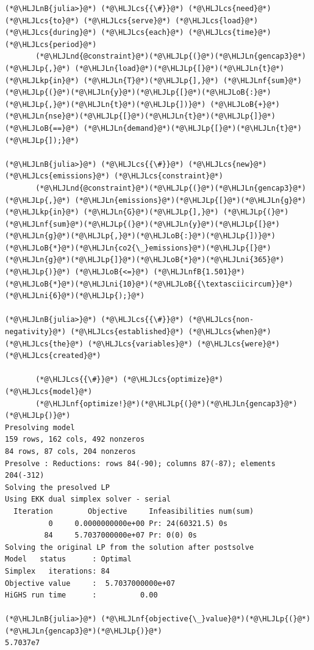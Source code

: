 \documentclass[12pt,a4paper]{article}
\newcommand{\HLJLkp}[1]{\textcolor[RGB]{148,91,176}{\textbf{#1}}}
\newcommand{\HLJLn}[1]{#1}
\newcommand{\HLJLnd}[1]{\textcolor[RGB]{214,102,97}{#1}}
\newcommand{\HLJLnf}[1]{\textcolor[RGB]{66,102,213}{#1}}
\newcommand{\HLJLnB}[1]{\textcolor[RGB]{59,151,46}{#1}}
\newcommand{\HLJLnfB}[1]{\textcolor[RGB]{59,151,46}{#1}}
\newcommand{\HLJLni}[1]{\textcolor[RGB]{59,151,46}{#1}}
\newcommand{\HLJLoB}[1]{\textcolor[RGB]{102,102,102}{\textbf{#1}}}
\newcommand{\HLJLp}[1]{#1}
\newcommand{\HLJLcs}[1]{\textcolor[RGB]{153,153,119}{\textit{#1}}}
\begin{document}
\begin{lstlisting}
(*@\HLJLnB{julia>}@*) (*@\HLJLcs{{\#}}@*) (*@\HLJLcs{need}@*) (*@\HLJLcs{to}@*) (*@\HLJLcs{serve}@*) (*@\HLJLcs{load}@*) (*@\HLJLcs{during}@*) (*@\HLJLcs{each}@*) (*@\HLJLcs{time}@*) (*@\HLJLcs{period}@*)
       (*@\HLJLnd{@constraint}@*)(*@\HLJLp{(}@*)(*@\HLJLn{gencap3}@*)(*@\HLJLp{,}@*) (*@\HLJLn{load}@*)(*@\HLJLp{[}@*)(*@\HLJLn{t}@*) (*@\HLJLkp{in}@*) (*@\HLJLn{T}@*)(*@\HLJLp{],}@*) (*@\HLJLnf{sum}@*)(*@\HLJLp{(}@*)(*@\HLJLn{y}@*)(*@\HLJLp{[}@*)(*@\HLJLoB{:}@*)(*@\HLJLp{,}@*)(*@\HLJLn{t}@*)(*@\HLJLp{])}@*) (*@\HLJLoB{+}@*) (*@\HLJLn{nse}@*)(*@\HLJLp{[}@*)(*@\HLJLn{t}@*)(*@\HLJLp{]}@*) (*@\HLJLoB{==}@*) (*@\HLJLn{demand}@*)(*@\HLJLp{[}@*)(*@\HLJLn{t}@*)(*@\HLJLp{]);}@*)

(*@\HLJLnB{julia>}@*) (*@\HLJLcs{{\#}}@*) (*@\HLJLcs{new}@*) (*@\HLJLcs{emissions}@*) (*@\HLJLcs{constraint}@*)
       (*@\HLJLnd{@constraint}@*)(*@\HLJLp{(}@*)(*@\HLJLn{gencap3}@*)(*@\HLJLp{,}@*) (*@\HLJLn{emissions}@*)(*@\HLJLp{[}@*)(*@\HLJLn{g}@*) (*@\HLJLkp{in}@*) (*@\HLJLn{G}@*)(*@\HLJLp{],}@*) (*@\HLJLp{(}@*)(*@\HLJLnf{sum}@*)(*@\HLJLp{(}@*)(*@\HLJLn{y}@*)(*@\HLJLp{[}@*)(*@\HLJLn{g}@*)(*@\HLJLp{,}@*)(*@\HLJLoB{:}@*)(*@\HLJLp{])}@*)(*@\HLJLoB{*}@*)(*@\HLJLn{co2{\_}emissions}@*)(*@\HLJLp{[}@*)(*@\HLJLn{g}@*)(*@\HLJLp{]}@*)(*@\HLJLoB{*}@*)(*@\HLJLni{365}@*)(*@\HLJLp{)}@*) (*@\HLJLoB{<=}@*) (*@\HLJLnfB{1.501}@*)(*@\HLJLoB{*}@*)(*@\HLJLni{10}@*)(*@\HLJLoB{{\textasciicircum}}@*)(*@\HLJLni{6}@*)(*@\HLJLp{);}@*)

(*@\HLJLnB{julia>}@*) (*@\HLJLcs{{\#}}@*) (*@\HLJLcs{non-negativity}@*) (*@\HLJLcs{established}@*) (*@\HLJLcs{when}@*) (*@\HLJLcs{the}@*) (*@\HLJLcs{variables}@*) (*@\HLJLcs{were}@*) (*@\HLJLcs{created}@*)
       
       (*@\HLJLcs{{\#}}@*) (*@\HLJLcs{optimize}@*) (*@\HLJLcs{model}@*)
       (*@\HLJLnf{optimize!}@*)(*@\HLJLp{(}@*)(*@\HLJLn{gencap3}@*)(*@\HLJLp{)}@*)
Presolving model
159 rows, 162 cols, 492 nonzeros
84 rows, 87 cols, 204 nonzeros
Presolve : Reductions: rows 84(-90); columns 87(-87); elements 204(-312)
Solving the presolved LP
Using EKK dual simplex solver - serial
  Iteration        Objective     Infeasibilities num(sum)
          0     0.0000000000e+00 Pr: 24(60321.5) 0s
         84     5.7037000000e+07 Pr: 0(0) 0s
Solving the original LP from the solution after postsolve
Model   status      : Optimal
Simplex   iterations: 84
Objective value     :  5.7037000000e+07
HiGHS run time      :          0.00

(*@\HLJLnB{julia>}@*) (*@\HLJLnf{objective{\_}value}@*)(*@\HLJLp{(}@*)(*@\HLJLn{gencap3}@*)(*@\HLJLp{)}@*)
5.7037e7
\end{lstlisting}
\end{document}
